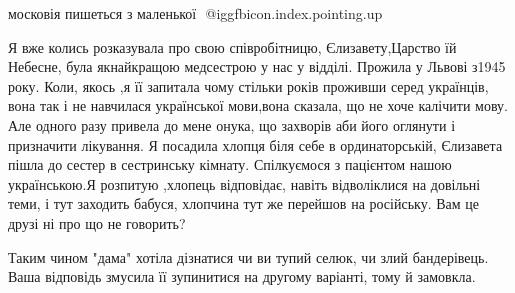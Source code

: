 \begin{itemize}
московія пишеться з маленької ️
@igg{fbicon.index.pointing.up}

 

Я вже колись розказувала про свою співробітницю, Єлизавету,Царство їй Небесне,
була якнайкращою медсестрою у нас у відділі. Прожила у Львові з1945 року. Коли,
якось ,я її запитала чому стільки років проживши серед українців, вона так і не
навчилася української мови,вона сказала, що не хоче калічити мову. Але одного
разу привела до мене онука, що захворів аби його оглянути і призначити
лікування. Я посадила хлопця біля себе в ординаторській, Єлизавета пішла до
сестер в сестринську кімнату. Спілкуємося з пацієнтом нашою українською.Я
розпитую ,хлопець відповідає, навіть відволіклися на довільні теми, і тут
заходить бабуся, хлопчина тут же перейшов на російську. Вам це друзі ні про що
не говорить?


 
Таким чином "дама" хотіла дізнатися чи ви тупий селюк, чи злий бандерівець.
Ваша відповідь змусила її зупинитися на другому варіанті, тому й замовкла.
\end{itemize}

